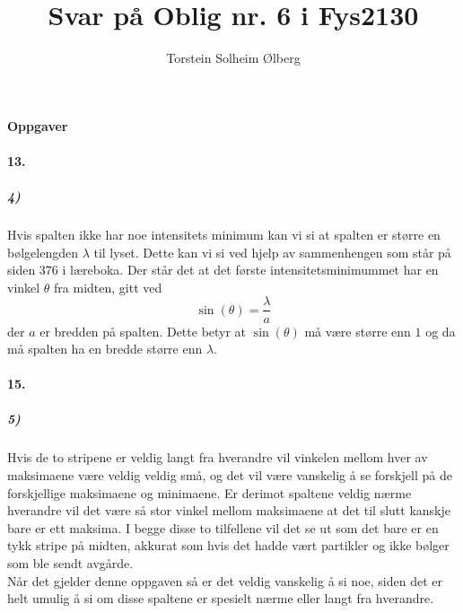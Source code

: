 \documentclass[11pt, A4paper,norsk]{article}
\author{Torstein Solheim Ølberg}
\title{Svar på Oblig nr. 6 i Fys2130}
\begin{document}
\maketitle
	\begin{center}
\Large \textbf{Oppgaver}
	\end{center}









		\paragraph{13.}
			\subparagraph{4)}
				\begin{flushleft}
Hvis spalten ikke har noe intensitets minimum kan vi si at spalten er større en bølgelengden $\lambda$ til lyset. Dette kan vi si ved hjelp av sammenhengen som står på siden $376$ i læreboka. Der står det at det første intensitetsminimummet har en vinkel $\theta$ fra midten, gitt ved
$$\sin(\theta) = \frac{\lambda}{a}$$
der $a$ er bredden på spalten. Dette betyr at $\sin(\theta)$ må være større enn $1$ og da må spalten ha en bredde større enn $\lambda$.
				\end{flushleft}








		\paragraph{15.}
			\subparagraph{5)}
				\begin{flushleft}
Hvis de to stripene er veldig langt fra hverandre vil vinkelen mellom hver av maksimaene være veldig veldig små, og det vil være vanskelig å se forskjell på de forskjellige maksimaene og minimaene. Er derimot spaltene veldig nærme hverandre vil det være så stor vinkel mellom maksimaene at det til slutt kanskje bare er ett maksima. I begge disse to tilfellene vil det se ut som det bare er en tykk stripe på midten, akkurat som hvis det hadde vært partikler og ikke bølger som ble sendt avgårde. \\
Når det gjelder denne oppgaven så er det veldig vanskelig å si noe, siden det er helt umulig å si om disse spaltene er spesielt nærme eller langt fra hverandre.
				\end{flushleft}
\end{document}
